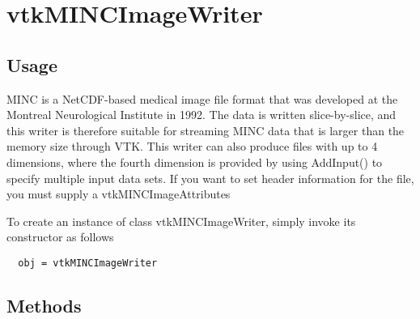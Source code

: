 \section{vtkMINCImageWriter}

\subsection{Usage}

 MINC is a NetCDF-based medical image file format that was developed
 at the Montreal Neurological Institute in 1992. 
 The data is written slice-by-slice, and this writer is therefore
 suitable for streaming MINC data that is larger than the memory
 size through VTK.  This writer can also produce files with up to
 4 dimensions, where the fourth dimension is provided by using
 AddInput() to specify multiple input data sets.  If you want to
 set header information for the file, you must supply a
 vtkMINCImageAttributes 

To create an instance of class vtkMINCImageWriter, simply
invoke its constructor as follows
\begin{verbatim}
  obj = vtkMINCImageWriter
\end{verbatim}
\subsection{Methods}

